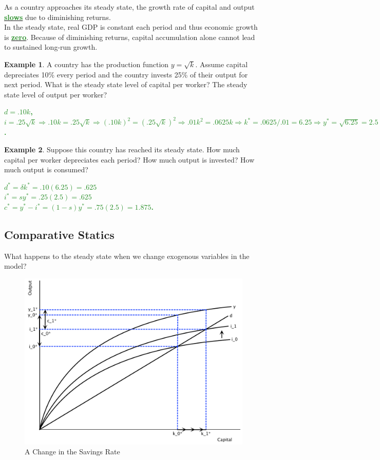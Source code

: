 \documentclass[11pt]{article}\usepackage[]{graphicx}\usepackage[]{color}
\theoremstyle{definition}
\newtheorem{exmp}{Example}[section]
\newcommand{\blank}[1]{}
\newcommand{\ddp}[1]{{\textbf{\textcolor{ForestGreen}{#1}}}}
\newcommand{\dd}[1]{{\underline{\textbf{\textcolor{ForestGreen}{#1}}}}}
\begin{document}
As a country approaches its steady state, the growth rate of capital and output \dd{slows} due to diminishing returns. 
\\

In the steady state, real GDP is constant each period and thus economic growth is \dd{zero}. Because of diminishing returns, capital accumulation alone cannot lead to sustained long-run growth. 

\begin{exmp} 
A country has the production function $y = \sqrt{k}$. Assume capital depreciates 10\% every period and the country invests 25\% of their output for next period. What is the steady state level of capital per worker? The steady state level of output per worker? 
\end{exmp}

\ddp{$d = .10k$, $i=.25\sqrt{k} \Rightarrow .10k = .25\sqrt{k} \Rightarrow (.10k)^2 = (.25\sqrt{k})^2 \Rightarrow .01k^2 = .0625k \Rightarrow k^* = .0625/.01 = 6.25 \Rightarrow y^* = \sqrt{6.25} = 2.5$.}
\blank{}
\blank{}

\begin{exmp}
Suppose this country has reached its steady state. How much capital per worker depreciates each period? How much output is invested? How much output is consumed? 
\end{exmp} 
\ddp{$d^* = \delta k^* = .10(6.25) = .625$ \\
	$i^* = sy^* = .25(2.5) = .625$ \\
	$c^* = y^* - i^* = (1-s)y^* = .75(2.5) = 1.875$.}
\blank{}
\blank{}

\subsection{Comparative Statics}

What happens to the steady state when we change exogenous variables in the model?


		\begin{figure}[H]
			\centering
			\includegraphics[scale=.40]{plot86.pdf}
			\caption{A Change in the Savings Rate}
		\end{figure}
		
\end{document}
